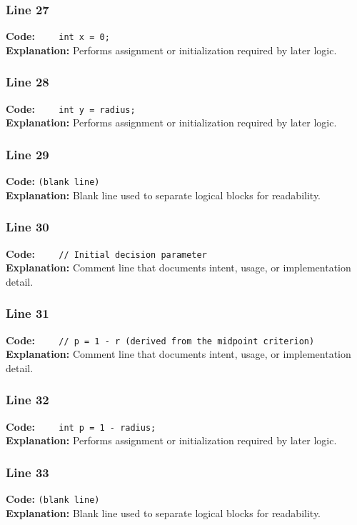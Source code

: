 \documentclass[11pt,a4paper]{article}
\begin{document}
\subsubsection*{Line 27}
\textbf{Code:} \verb|    int x = 0;|\\
\textbf{Explanation:} Performs assignment or initialization required by later logic.

\subsubsection*{Line 28}
\textbf{Code:} \verb|    int y = radius;|\\
\textbf{Explanation:} Performs assignment or initialization required by later logic.

\subsubsection*{Line 29}
\textbf{Code:} \texttt{(blank line)}\\
\textbf{Explanation:} Blank line used to separate logical blocks for readability.

\subsubsection*{Line 30}
\textbf{Code:} \verb|    // Initial decision parameter|\\
\textbf{Explanation:} Comment line that documents intent, usage, or implementation detail.

\subsubsection*{Line 31}
\textbf{Code:} \verb|    // p = 1 - r (derived from the midpoint criterion)|\\
\textbf{Explanation:} Comment line that documents intent, usage, or implementation detail.

\subsubsection*{Line 32}
\textbf{Code:} \verb|    int p = 1 - radius;|\\
\textbf{Explanation:} Performs assignment or initialization required by later logic.

\subsubsection*{Line 33}
\textbf{Code:} \texttt{(blank line)}\\
\textbf{Explanation:} Blank line used to separate logical blocks for readability.
\end{document}
